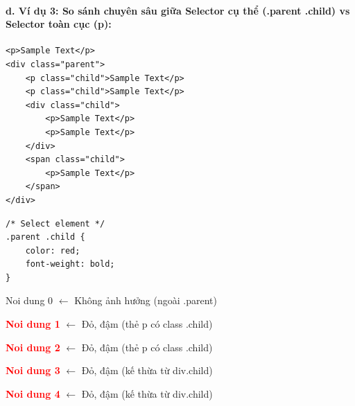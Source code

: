 \documentclass[11pt,oneside]{book}
\begin{document}
\paragraph{d. Ví dụ 3: So sánh chuyên sâu giữa Selector cụ thể (.parent .child) vs Selector toàn cục (p):}

\begin{codeWindow}
\begin{lstlisting}[language=HTML5]
<p>Sample Text</p>
<div class="parent">
    <p class="child">Sample Text</p>
    <p class="child">Sample Text</p>
    <div class="child">
        <p>Sample Text</p>
        <p>Sample Text</p>
    </div>
    <span class="child">
        <p>Sample Text</p>
    </span>
</div>
\end{lstlisting}
\end{codeWindow}

\begin{codeWindow}
\begin{lstlisting}[language=CSS3]
/* Select element */
.parent .child {
    color: red;
    font-weight: bold;
}
\end{lstlisting}
\end{codeWindow}

\begin{browserWindow}
\sffamily\small
\textcolor{darkText}{Noi dung 0} {\small\textcolor{gray!60}{$\leftarrow$ Không ảnh hưởng (ngoài .parent)}} \par\vspace{4pt}
\begin{tcolorbox}[arc=2pt, colback=primaryBlue!5, colframe=primaryBlue!40, boxrule=1pt, title={\sffamily\small\color{white}\textbf{.parent}}, colbacktitle=primaryBlue!70]
\textcolor{red}{\textbf{Noi dung 1}} {\small\textcolor{gray!60}{$\leftarrow$ Đỏ, đậm (thẻ p có class .child)}} \par\vspace{2pt}
\textcolor{red}{\textbf{Noi dung 2}} {\small\textcolor{gray!60}{$\leftarrow$ Đỏ, đậm (thẻ p có class .child)}} \par\vspace{3pt}
\begin{tcolorbox}[arc=2pt, colback=red!5, colframe=red!40, boxrule=1pt, title={\sffamily\scriptsize\color{white}\textbf{div.child (Đổi màu toàn bộ nội dung trong div)}}, colbacktitle=red!70]
\textcolor{red}{\textbf{Noi dung 3}} {\small\textcolor{gray!60}{$\leftarrow$ Đỏ, đậm (kế thừa từ div.child)}} \par\vspace{2pt}
\textcolor{red}{\textbf{Noi dung 4}} {\small\textcolor{gray!60}{$\leftarrow$ Đỏ, đậm (kế thừa từ div.child)}}
\end{tcolorbox}\vspace{3pt}
\end{tcolorbox}
\end{browserWindow}
\end{document}
